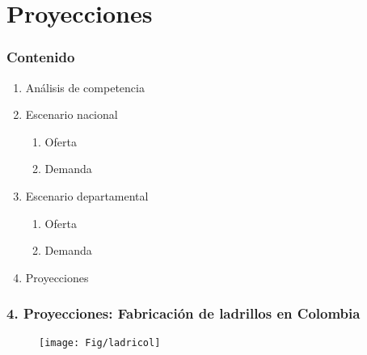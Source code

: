 \documentclass[10pt]{beamer}
\begin{document}
\section{Proyecciones}
\begin{frame}
\frametitle{Contenido}
\begin{enumerate}[<i->]
\item Análisis de competencia 
\item  Escenario nacional
\begin{enumerate} [a]
\item Oferta
\item Demanda
\end{enumerate}
\item Escenario departamental
\begin{enumerate} [a]
\item Oferta
\item Demanda
\end{enumerate}
\item<1-> Proyecciones
\end{enumerate}
\end{frame}


\begin{frame}
\frametitle{4. Proyecciones: Fabricación de ladrillos en Colombia}

\begin{flushleft}
{\tiny }
 \end{flushleft} 

\begin{figure}
\texttt{[image: Fig/ladricol]}
\centering
  \label{fig:ejemplo}  
\end{figure}
\end{frame}
\end{document}

